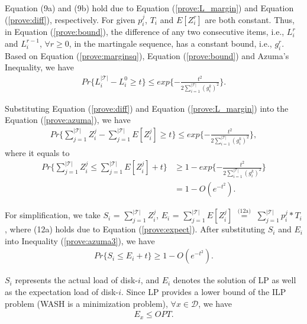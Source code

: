 \documentclass[conference]{IEEEtran}
\begin{document}
\vspace{-0.15cm}
Equation (9a) and (9b) hold due to Equation (\ref{prove:L_margin}) and Equation (\ref{prove:diff}), respectively. For given $p_i^j$, $T_i$ and $E[Z_i^r]$ are both constant. Thus, in Equation (\ref{prove:bound}), the difference of any two consecutive items, i.e., $L_i^r$ and $L_i^{r-1}$, $\forall r \geq 0$, in the martingale sequence, has a constant bound, i.e., $g_i^r$. Based on Equation (\ref{prove:marginsq}), Equation (\ref{prove:bound}) and Azuma's Inequality, we have
\vspace{-0.3cm}
\begin{align}
Pr\{L_i^{|\mathcal{T}|} - L_i^{0} \geq t\} \leq exp\{-\frac{t^2}{2\sum_{ i = 1 }^{|\mathcal{T}|}(g_i^k)^2}\}. \label{prove:azuma}
\end{align}

\vspace{-0.1cm}
Substituting Equation (\ref{prove:diff}) and Equation (\ref{prove:L_margin}) into the  Equation (\ref{prove:azuma}), we have  
\vspace{-0.2cm}
\begin{align}
Pr\{\sum\nolimits_{j = 1}^{|\mathcal{T}|} Z_i^j - 
	\sum\nolimits_{j = 1}^{|\mathcal{T}|} E[Z_i^j]\geq t\} \leq exp\{-\frac{t^2}{2\sum_{ i = 1 }^{|\mathcal{T}|}(g_i^k)^2}\},\nonumber
\end{align}
 \vspace{-0.2cm}
 where it equals to
\begin{align}
Pr\{\sum_{j = 1}^{|\mathcal{T}|} Z_i^j \leq \sum_{j = 1}^{|\mathcal{T}|} E[Z_i^j] + t\} & \geq 1 - exp\{-\frac{t^2}{2\sum_{ i = 1 }^{|\mathcal{T}|}(g_i^k)^2}\}\nonumber\\
& = 1 - O(e^{-t^2}).\label{prove:azuma3}
\end{align}

\vspace{-0.2cm}
For simplification, we take $S_i$  = $\sum_{j = 1}^{|\mathcal{T}|} Z_i^j$,
$E_i$ = $\sum_{j = 1}^{|\mathcal{T}|} E[Z_i^j]$
$\overset{\text{(12a)}}{=}$
$\sum_{j = 1}^{|\mathcal{T}|} p_i^j*T_i$, where (12a) holds due to Equation (\ref{prove:expect}). After substituting $S_i$ and $E_i$ into Inequality (\ref{prove:azuma3}), we have
\vspace{-0.2cm}
\begin{align}
Pr\{S_i \leq E_i + t\} \geq 1- O(e^{-t^2}). \label{prove:SU}
\end{align}

\vspace{-0.2cm}
$S_i$ represents the actual load of disk-$i$, and $E_i$ denotes the solution of LP as well as the expectation load of disk-$i$. Since LP provides a lower bound of the ILP problem (WASH is a minimization problem), $\forall x \in \mathcal{D}$, we have
\vspace{-0.2cm}
\begin{align}
E_x \leq OPT.\label{prove:OPT}
\end{align}
\end{document}
